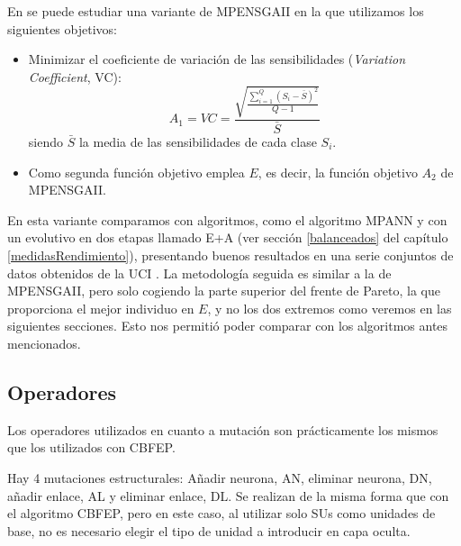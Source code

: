 En \cite{Fernandez2009a} se puede estudiar una variante de MPENSGAII en la que
utilizamos los siguientes objetivos:
\begin{itemize}
\item Minimizar el coeficiente de variación de las sensibilidades (\textit{Variation
Coefficient}, VC):
\begin{displaymath}
A_{1}=VC=\frac{\sqrt{\frac{\sum_{i=1}^{Q}(S_{i}-\bar{S})^2}{Q-1}}}{\bar{S}}
\end{displaymath}
siendo $\bar{S}$ la media de las sensibilidades de cada clase $S_{i}$.
\item Como segunda función objetivo emplea $E$, es decir, la función
objetivo $A_{2}$ de MPENSGAII.
\end{itemize}

En esta variante comparamos con algoritmos, como el algoritmo MPANN \cite{Abbass2003} y
con un
evolutivo en dos etapas llamado E+A \cite{Martinez-Estudillo2008} (ver sección \ref{balanceados} del
capítulo \ref{medidasRendimiento}), presentando buenos resultados en una serie conjuntos de datos
obtenidos de la UCI \cite{UCI2007}. La metodología seguida es similar a la de MPENSGAII,
pero solo cogiendo la parte superior del frente de Pareto, la que proporciona el mejor
individuo en $E$, y no los dos extremos como veremos en las siguientes secciones.
Esto nos permitió poder comparar con los algoritmos antes mencionados.
\newpage
\subsection{Operadores}\label{operadoresMPENSGAII}
\noindent Los operadores utilizados  en cuanto a mutación son prácticamente los mismos que
los utilizados con CBFEP.

Hay 4 mutaciones estructurales: Añadir neurona, AN, eliminar neurona,
DN, añadir enlace, AL y eliminar enlace, DL. Se realizan de la misma forma que con el
algoritmo CBFEP, pero en este caso, al utilizar solo SUs como unidades de base, no es
necesario elegir el tipo de unidad a introducir en capa oculta.

